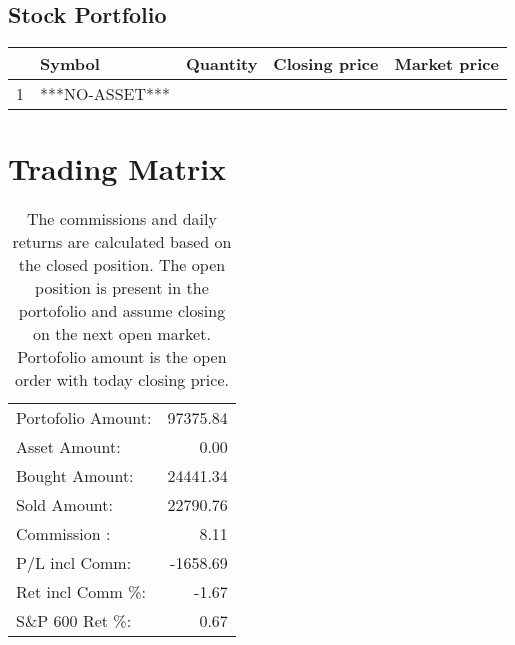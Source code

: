 \documentclass{tufte-handout}\usepackage[]{graphicx}\usepackage[]{color}
\begin{document}
\subsection{Stock Portfolio}
\begin{table}[ht]
\centering
\begin{tabular}{llrrr}
  \hline
 & Symbol & Quantity & Closing price & Market price \\ 
  \hline
1 & ***NO-ASSET*** &  &  &  \\ 
   \hline
\end{tabular}
\end{table}



\section{Trading Matrix}

\begin{table}[ht]
\begin{tabular}{lr}
   \hline
Portofolio Amount: & 97375.84 \\ 
  Asset Amount: & 0.00 \\ 
  Bought Amount: & 24441.34 \\ 
  Sold   Amount: & 22790.76 \\ 
  Commission   : & 8.11 \\ 
  P/L incl Comm: & -1658.69 \\ 
  Ret incl Comm \%: & -1.67 \\ 
  S\&P 600 Ret \%: & 0.67 \\ 
   \hline
\end{tabular}
\caption{The commissions and daily returns are calculated based on the closed position.
The open position is present in the portofolio and assume closing on the next open market.
Portofolio amount is the open order with today closing price.} 
\end{table}



% 
% 
\end{document}
